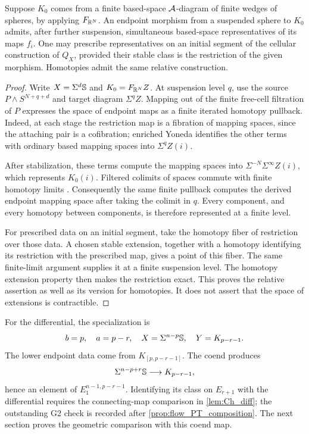\begin{lem}\label{lem:ChModels.finite_representatives}
    Suppose $K_0$ comes from a finite based-space $\mathcal{A}$-diagram of finite wedges of spheres, by applying $F_{\mathbb{R}^N}$. An endpoint morphism from a suspended sphere to $K_0$ admits, after further suspension, simultaneous based-space representatives of its maps $f_i$. One may prescribe representatives on an initial segment of the cellular construction of $Q_X$, provided their stable class is the restriction of the given morphism. Homotopies admit the same relative construction.
\end{lem}
\begin{proof}
    Write $X=\Sigma^d\mathbb{S}$ and $K_0=F_{\mathbb{R}^N}Z$. At suspension level $q$, use the source $P\wedge S^{N+q+d}$ and target diagram $\Sigma^q Z$. Mapping out of the finite free-cell filtration of $P$ expresses the space of endpoint maps as a finite iterated homotopy pullback. Indeed, at each stage the restriction map is a fibration of mapping spaces, since the attaching pair is a cofibration; enriched Yoneda identifies the other terms with ordinary based mapping spaces into $\Sigma^q Z(i)$.

    After stabilization, these terms compute the mapping spaces into $\Sigma^{-N}\Sigma^\infty Z(i)$, which represents $K_0(i)$. Filtered colimits of spaces commute with finite homotopy limits \cite[Proposition~5.3.3.3]{Lur09}. Consequently the same finite pullback computes the derived endpoint mapping space after taking the colimit in $q$. Every component, and every homotopy between components, is therefore represented at a finite level.

    For prescribed data on an initial segment, take the homotopy fiber of restriction over those data. A chosen stable extension, together with a homotopy identifying its restriction with the prescribed map, gives a point of this fiber. The same finite-limit argument supplies it at a finite suspension level. The homotopy extension property then makes the restriction exact. This proves the relative assertion as well as its version for homotopies. It does not assert that the space of extensions is contractible.
\end{proof}

For the differential, the specialization is
\[
    b=p,\quad a=p-r,\quad X=\Sigma^{n-p}\mathbb{S},
    \quad Y=K_{p-r-1}.
\]
The lower endpoint data come from $K_{[p,p-r-1]}$. The coend produces
\[
    \Sigma^{n-p+r}\mathbb{S}\longrightarrow K_{p-r-1},
\]
hence an element of $E_1^{n-1,p-r-1}$. Identifying its class on $E_{r+1}$ with the differential requires the connecting-map comparison in \cref{lem:Ch_diff}; the outstanding G2 check is recorded after \cref{prop:flow_PT_composition}. The next section proves the geometric comparison with this coend map.
